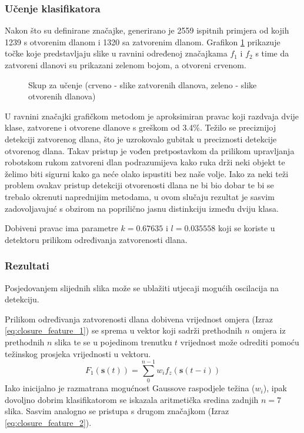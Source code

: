 \documentclass[times, utf8, diplomski, numeric]{fer}
\begin{document}
\subsubsection{Učenje klasifikatora}
Nakon što su definirane značajke, generirano je 2559 ispitnih primjera od kojih 1239 s otvorenim dlanom i 1320 sa zatvorenim dlanom. Grafikon \ref{scatter_me} prikazuje točke koje predstavljaju slike u ravnini određenoj značajkama $f_{1}$ i $f_{2}$ s time da zatvoreni dlanovi su prikazani zelenom bojom, a otvoreni crvenom.

\begin{figure}[h!]

\centering

\renewcommand{\figurename}{Grafikon}
	\caption{Skup za učenje (crveno - slike zatvorenih dlanova, zeleno - slike otvorenih dlanova)}
\label{scatter_me}
\end{figure}

U ravnini značajki grafičkom metodom je aproksimiran pravac koji razdvaja dvije klase, zatvorene i otvorene dlanove s greškom od 3.4\%. Težilo se preciznijoj detekciji zatvorenog dlana, što je uzrokovalo gubitak u preciznosti detekcije otvorenog dlana. Takav pristup je vođen pretpostavkom da prilikom upravljanja robotskom rukom zatvoreni dlan podrazumijeva kako ruka drži neki objekt te želimo biti sigurni kako ga neće olako ispustiti bez naše volje. Iako za neki teži problem ovakav pristup detekciji otvorenosti dlana ne bi bio dobar te bi se trebalo okrenuti naprednijim metodama, u ovom slučaju rezultat je sasvim zadovoljavajuć s obzirom na poprilično jasnu distinkciju između dviju klasa.

Dobiveni pravac ima parametre $k = 0.67635$ i $l=0.035558$ koji se koriste u detektoru prilikom određivanja zatvorenosti dlana.

\subsubsection{Rezultati}
\label{sec:tuning}
Posjedovanjem slijednih slika može se ublažiti utjecaji mogućih oscilacija na detekciju.

Prilikom određivanja zatvorenosti dlana dobivena vrijednost omjera (Izraz \ref{eq:closure_feature_1}) se sprema u vektor koji sadrži prethodnih $ n $  omjera iz prethodnih $n$ slika te se u pojedinom trenutku $t$ vrijednost može odrediti pomoću težinskog prosjeka vrijednosti u vektoru.
\begin{equation}\label{eq:advanced_closure_feature}
F_{1}(\mathbf{s}(t))=\sum_{0}^{n-1} w_{i}f_{z}(\mathbf{s}(t-i))
\end{equation}
Iako inicijalno je razmatrana mogućnost Gaussove raspodjele težina ($w_{i}$), ipak dovoljno dobrim klasifikatorom se iskazala aritmetička sredina zadnjih $n=7$ slika. Sasvim analogno se pristupa s drugom značajkom (Izraz \ref{eq:closure_feature_2}).
\end{document}
